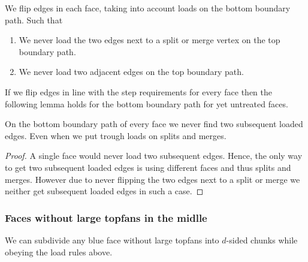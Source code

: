   We flip edges in each face, taking into account loads on the bottom boundary path. Such that

  \begin{enumerate}
    \item We never load the two edges next to a split or merge vertex on the top boundary path.
    \item We never load two adjacent edges on the top boundary path.
  \end{enumerate}

  If we flip edges in line with the step requirements for every face then the following lemma holds for the bottom boundary path for yet untreated faces.

  \begin{lemma}
    \label{lm:}
    On the bottom boundary path of every face we never find two subsequent loaded edges. Even when we put trough loads on splits and merges.
  \end{lemma}
  \begin{proof}
    A single face would never load two subsequent edges. Hence, the only way to get two subsequent loaded edges is using different faces and thus splits and merges.
    However due to never flipping the two edges next to a split or merge we neither get subsequent loaded edges in such a case.
  \end{proof}


\subsubsection{Faces without large topfans in the midlle}
  \begin{lemma}
    \label{lm:subdiv:withoutTopfan}
    We can subdivide any blue face without large topfans into $d$-sided chunks while obeying the load rules above.
  \end{lemma}

